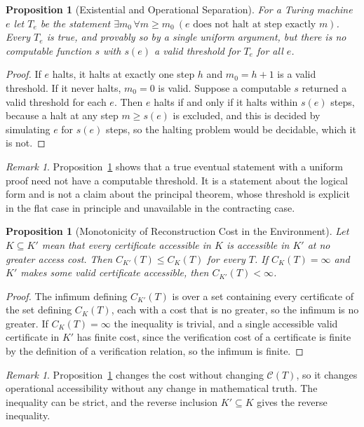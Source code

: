\documentclass[11pt,letterpaper]{report}
\theoremstyle{plain}
\newtheorem{proposition}[theorem]{Proposition}
\theoremstyle{definition}
\theoremstyle{remark}
\newtheorem{remark}[theorem]{Remark}
\begin{document}
\begin{proposition}[Existential and Operational Separation]\label{pr:nothreshold}
For a Turing machine $e$ let $T_e$ be the statement $\exists m_0\,\forall m\ge m_0\ (e\text{ does not halt at step exactly }m)$. Every $T_e$ is true, and provably so by a single uniform argument, but there is no computable function $s$ with $s(e)$ a valid threshold for $T_e$ for all $e$.
\end{proposition}
\begin{proof}
If $e$ halts, it halts at exactly one step $h$ and $m_0=h+1$ is a valid threshold. If it never halts, $m_0=0$ is valid. Suppose a computable $s$ returned a valid threshold for each $e$. Then $e$ halts if and only if it halts within $s(e)$ steps, because a halt at any step $m\ge s(e)$ is excluded, and this is decided by simulating $e$ for $s(e)$ steps, so the halting problem would be decidable, which it is not.
\end{proof}

\begin{remark}
Proposition~\ref{pr:nothreshold} shows that a true eventual statement with a uniform proof need not have a computable threshold. It is a statement about the logical form and is not a claim about the principal theorem, whose threshold is explicit in the flat case in principle and unavailable in the contracting case.
\end{remark}

\begin{proposition}[Monotonicity of Reconstruction Cost in the Environment]\label{pr:envmono}
Let $K\subseteq K'$ mean that every certificate accessible in $K$ is accessible in $K'$ at no greater access cost. Then $C_{K'}(T)\le C_K(T)$ for every $T$. If $C_K(T)=\infty$ and $K'$ makes some valid certificate accessible, then $C_{K'}(T)<\infty$.
\end{proposition}
\begin{proof}
The infimum defining $C_{K'}(T)$ is over a set containing every certificate of the set defining $C_K(T)$, each with a cost that is no greater, so the infimum is no greater. If $C_K(T)=\infty$ the inequality is trivial, and a single accessible valid certificate in $K'$ has finite cost, since the verification cost of a certificate is finite by the definition of a verification relation, so the infimum is finite.
\end{proof}

\begin{remark}
Proposition~\ref{pr:envmono} changes the cost without changing $\mathcal C(T)$, so it changes operational accessibility without any change in mathematical truth. The inequality can be strict, and the reverse inclusion $K'\subseteq K$ gives the reverse inequality.
\end{remark}
\end{document}
